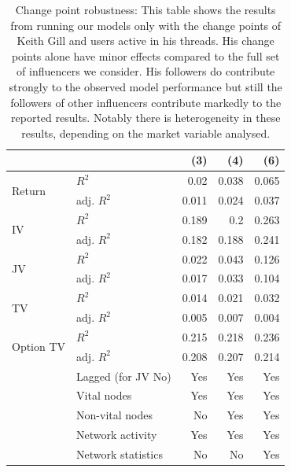 \begin{table}[ht]
\centering
\caption{Change point robustness: This table shows the results from running our models only with the 
                    change points of Keith Gill and users active in his threads. His change points alone have minor effects 
                    compared to the full set of influencers we consider. His followers do contribute strongly to the observed 
                    model performance but still the followers of other influencers contribute markedly to the reported results. Notably there is heterogeneity in these results, depending on the market variable analysed.} 
\label{table_r2_robust_onlyKG}
\begingroup\scriptsize
\begin{tabular}{ll|rrr}
  \hline
\hline
  &   & (3) & (4) & (6) \\ 
  \hline
\multirow{2}{*}{Return} & $R^2$ & 0.02 & 0.038 & 0.065 \\ 
    & adj. $R^2$ & 0.011 & 0.024 & 0.037 \\ 
   \hline
\multirow{2}{*}{IV} & $R^2$ & 0.189 & 0.2 & 0.263 \\ 
    & adj. $R^2$ & 0.182 & 0.188 & 0.241 \\ 
   \hline
\multirow{2}{*}{JV} & $R^2$ & 0.022 & 0.043 & 0.126 \\ 
    & adj. $R^2$ & 0.017 & 0.033 & 0.104 \\ 
   \hline
\multirow{2}{*}{TV} & $R^2$ & 0.014 & 0.021 & 0.032 \\ 
    & adj. $R^2$ & 0.005 & 0.007 & 0.004 \\ 
   \hline
\multirow{2}{*}{Option TV} & $R^2$ & 0.215 & 0.218 & 0.236 \\ 
    & adj. $R^2$ & 0.208 & 0.207 & 0.214 \\ 
   \hline & Lagged (for JV No) & Yes & Yes & Yes \\ & Vital nodes & Yes & Yes & Yes \\ & Non-vital nodes & No & Yes & Yes \\ & Network activity & Yes & Yes & Yes \\ & Network statistics & No & No & Yes \\ \hline
\hline
\hline
\end{tabular}
\endgroup
\end{table}
